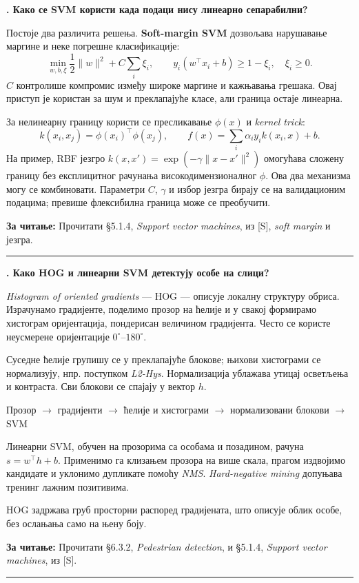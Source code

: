 \documentclass[10pt,a4paper]{article}
\newcommand{\en}[1]{\textit{#1}}
\newcounter{pitanje}
\newenvironment{odgovor}[1]{\stepcounter{pitanje}\begin{minipage}[t][0.455\textheight][t]{\textwidth}\vspace{0pt}\textbf{\thepitanje. #1}\par\smallskip}{\end{minipage}\par\ifodd\value{pitanje}\vspace{0.025\textheight}\hrule\vspace{0.015\textheight}\else\newpage\fi}
\newcommand{\izvor}[1]{\par\vfill{\footnotesize\textbf{За читање:} #1}\par}
\newcommand{\lanac}[1]{\begin{center}\small #1\end{center}}
\begin{document}
\begin{odgovor}{Како се SVM користи када подаци нису линеарно сепарабилни?}
Постоје два различита решења. \textbf{Soft-margin SVM} дозвољава нарушавање маргине и неке погрешне класификације:
\[
\min_{w,b,\xi}\frac12\|w\|^2+C\sum_i\xi_i,\qquad
y_i(w^\top x_i+b)\geq1-\xi_i,\quad\xi_i\geq0.
\]
$C$ контролише компромис између широке маргине и кажњавања грешака. Овај приступ је користан за шум и преклапајуће класе, али граница остаје линеарна.

За нелинеарну границу користи се пресликавање $\phi(x)$ и \en{kernel trick}:
\[
k(x_i,x_j)=\phi(x_i)^\top\phi(x_j),\qquad
f(x)=\sum_i\alpha_i y_i k(x_i,x)+b.
\]
На пример, RBF језгро $k(x,x')=\exp(-\gamma\|x-x'\|^2)$ омогућава сложену границу без експлицитног рачунања високодимензионалног $\phi$. Ова два механизма могу се комбиновати. Параметри $C$, $\gamma$ и избор језгра бирају се на валидационим подацима; превише флексибилна граница може се преобучити.
\izvor{Прочитати §5.1.4, \en{Support vector machines}, из [S], \en{soft margin} и језгра.}
\end{odgovor}

\begin{odgovor}{Како HOG и линеарни SVM детектују особе на слици?}
\en{Histogram of oriented gradients} — HOG — описује локалну структуру обриса. Израчунамо градијенте, поделимо прозор на ћелије и у свакој формирамо хистограм оријентација, пондерисан величином градијента. Често се користе неусмерене оријентације $0^\circ$--$180^\circ$.

Суседне ћелије групишу се у преклапајуће блокове; њихови хистограми се нормализују, нпр. поступком \en{L2-Hys}. Нормализација ублажава утицај осветљења и контраста. Сви блокови се спајају у вектор $h$.
\lanac{Прозор $\to$ градијенти $\to$ ћелије и хистограми $\to$ нормализовани блокови $\to$ SVM}
Линеарни SVM, обучен на прозорима са особама и позадином, рачуна $s=w^\top h+b$. Применимо га клизањем прозора на више скала, прагом издвојимо кандидате и уклонимо дупликате помоћу \en{NMS}. \en{Hard-negative mining} допуњава тренинг лажним позитивима.

HOG задржава груб просторни распоред градијената, што описује облик особе, без ослањања само на њену боју.
\izvor{Прочитати §6.3.2, \en{Pedestrian detection}, и §5.1.4, \en{Support vector machines}, из [S].}
\end{odgovor}
\end{document}
